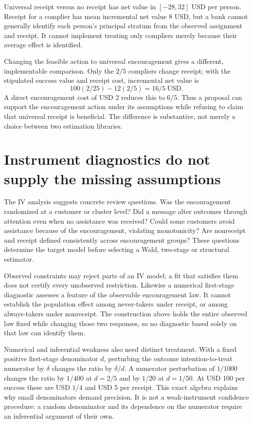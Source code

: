 Universal receipt versus no receipt has net value
in $[-28,32]$ USD per person. Receipt for a complier has mean
incremental net value $8$ USD, but a bank cannot generally
identify each person's principal stratum from the observed
assignment and receipt. It cannot implement treating only
compliers merely because their average effect is
identified.\citep{angrist1996,exec17_s3_exact}

Changing the feasible action to universal encouragement gives
a different, implementable comparison. Only the $2/5$ compliers
change receipt; with the stipulated success value and receipt
cost, incremental net value is
\[
 100(2/25)-12(2/5)=16/5\ \text{USD}.
\]
A direct encouragement cost of USD 2 reduces this to $6/5$.
Thus a proposal can support the encouragement action under its
assumptions while refusing to claim that universal receipt is
beneficial. The difference is substantive, not merely a choice
between two estimation libraries.

\section{Instrument diagnostics do not supply the missing assumptions}

The IV analysis suggests concrete review questions. Was the
encouragement randomized at a customer or cluster level? Did a
message alter outcomes through attention even when no assistance
was received? Could some customers avoid assistance because of
the encouragement, violating monotonicity? Are nonreceipt and
receipt defined consistently across encouragement groups? These
questions determine the target model before selecting a Wald,
two-stage or structural estimator.

Observed constraints may reject parts of an IV model; a fit that
satisfies them does not certify every unobserved restriction.
Likewise a numerical first-stage diagnostic assesses a feature
of the observable encouragement law. It cannot establish the
population effect among never-takers under receipt, or among
always-takers under nonreceipt. The construction above holds
the entire observed law fixed while changing those two
responses, so no diagnostic based solely on that law can
identify them.\citep{angrist1996,exec17_s3_exact}

Numerical and inferential weakness also need distinct treatment.
With a fixed positive first-stage denominator $d$, perturbing
the outcome intention-to-treat numerator by $\delta$ changes
the ratio by $\delta/d$. A numerator perturbation of $1/1000$
changes the ratio by $1/400$ at $d=2/5$ and by $1/20$ at
$d=1/50$. At USD 100 per success these are USD $1/4$ and
USD 5 per receipt. This exact algebra explains why small
denominators demand precision. It is not a weak-instrument
confidence procedure: a random denominator and its dependence
on the numerator require an inferential argument of their
own.\citep{exec17_s3_exact}

